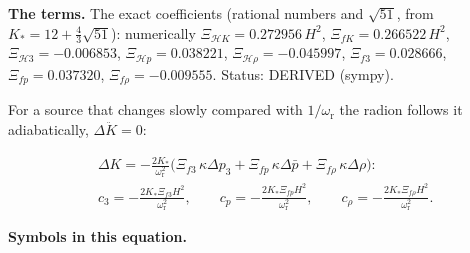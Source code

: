 \documentclass[
  10pt,
]{article}
\begin{document}
\textbf{The terms.} The exact coefficients (rational numbers and
\(\sqrt{51}\), from \(K_* = 12 + \frac43\sqrt{51}\)): numerically
\(\Xi_{\mathcal{H}K} = 0.272956\,H^2\), \(\Xi_{fK} = 0.266522\,H^2\),
\(\Xi_{\mathcal{H}3} = -0.006853\), \(\Xi_{\mathcal{H}p} = 0.038221\),
\(\Xi_{\mathcal{H}\rho} = -0.045997\), \(\Xi_{f3} = 0.028666\),
\(\Xi_{fp} = 0.037320\), \(\Xi_{f\rho} = -0.009555\). Status: DERIVED
(sympy).

For a source that changes slowly compared with \(1/\omega_{\mathrm{r}}\)
the radion follows it adiabatically, \(\Delta\ddot K = 0\):

\[
\begin{aligned}
&\Delta K = -\frac{2K_*}{\omega_{\mathrm{r}}^2}\big(\Xi_{f3}\,\kappa\Delta p_3 + \Xi_{fp}\,\kappa\Delta\bar p +
 \Xi_{f\rho}\,\kappa\Delta\rho\big):\\
&c_3 = -\frac{2K_*\Xi_{f3}H^2}{\omega_{\mathrm{r}}^2},\qquad c_p = -\frac{2K_*\Xi_{fp}H^2}{\omega_{\mathrm{r}}^2},\qquad
 c_\rho = -\frac{2K_*\Xi_{f\rho}H^2}{\omega_{\mathrm{r}}^2}.
\end{aligned}
\]

\textbf{Symbols in this equation.}
\end{document}
